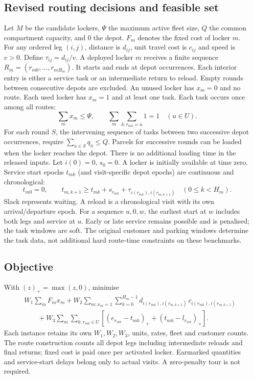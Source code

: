 \documentclass[11pt]{article}
\begin{document}
\subsection*{Revised routing decisions and feasible set}
Let $M$ be the candidate lockers, $\Psi$ the maximum active fleet size,
$Q$ the common compartment capacity, and $0$ the depot. $F_m$ denotes
the fixed cost of locker $m$. For any ordered leg $(i,j)$, distance is
$d_{ij}$, unit travel cost is $c_{ij}$ and speed is $v>0$. Define
$\tau_{ij}=d_{ij}/v$. A deployed locker $m$ receives a finite sequence
$R_m=(r_{m0},\ldots,r_{mH_m})$. It starts and ends at depot occurrences.
Each interior entry is either a service task or an intermediate return
to reload. Empty rounds between consecutive depots are excluded. An
unused locker has $x_m=0$ and no route. Each used locker has $x_m=1$
and at least one task. Each task occurs once among all routes:
\[
 \sum_m x_m\le\Psi,\qquad
 \sum_m\sum_{k:r_{mk}=u}1=1\quad(u\in U).
\]
For each round $S$, the intervening sequence of tasks between two
successive depot occurrences, require $\sum_{u\in S}q_u\le Q$.
Parcels for successive rounds can be loaded when the locker reaches the
depot. There is no additional loading time in the released inputs.
Let $i(0)=0$, $s_0=0$. A locker is initially available at time zero.
Service start epochs $t_{mk}$ (and visit-specific depot epochs)
are continuous and chronological:
\[
 t_{m0}=0,\qquad
 t_{m,k+1}\ge t_{mk}+s_{r_{mk}}+\tau_{i(r_{mk}),i(r_{m,k+1})}
 \quad(0\le k<H_m).
\]
Slack represents waiting. A reload is a chronological visit with its own
arrival/departure epoch. For a sequence $u,0,w$, the earliest start at
$w$ includes both legs and service at $u$. Early or late service remains
possible and is penalised; the task windows are soft. The original
customer and parking windows determine the task data, not additional hard
route-time constraints on these benchmarks.

\subsection*{Objective}
With $(z)_+=\max(z,0)$, minimise
\[
 \begin{aligned}
 &W_1\sum_m F_m x_m+
 W_2\sum_{m:x_m=1}\sum_{k=0}^{H_m-1}
       d_{i(r_{mk}),i(r_{m,k+1})}\,c_{i(r_{mk}),i(r_{m,k+1})}\\
 &\qquad{}+ W_3\sum_m\sum_{k:r_{mk}\in U}
       \left[(e_{r_{mk}}-t_{mk})_++(t_{mk}-l_{r_{mk}})_+\right].
 \end{aligned}
\]
Each instance retains its own $W_1,W_2,W_3$, units, rates, fleet and
customer counts. The route construction counts all depot legs including
intermediate reloads and final returns; fixed cost is paid once per
activated locker. Earmarked quantities and service-start delays belong
only to actual visits. A zero-penalty tour is not required.
\end{document}
